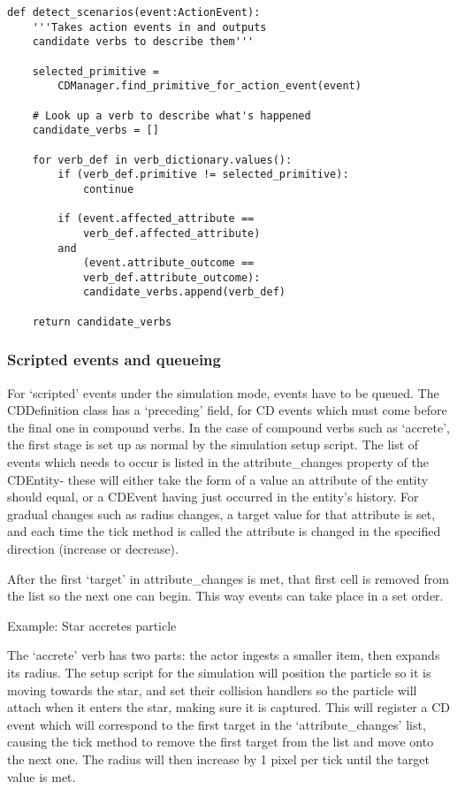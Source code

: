 \documentclass[dissertation.tex]{subfiles}
\begin{document}
\begin{lstlisting}[frame=single,caption={CDManager.detect\_scenarios method}]
def detect_scenarios(event:ActionEvent):
    '''Takes action events in and outputs
    candidate verbs to describe them'''
    
    selected_primitive =
        CDManager.find_primitive_for_action_event(event)            

    # Look up a verb to describe what's happened
    candidate_verbs = []

    for verb_def in verb_dictionary.values():
        if (verb_def.primitive != selected_primitive):
            continue

        if (event.affected_attribute ==
            verb_def.affected_attribute)
        and
            (event.attribute_outcome ==
            verb_def.attribute_outcome):
            candidate_verbs.append(verb_def)
    
    return candidate_verbs
\end{lstlisting}

    \subsubsection{Scripted events and queueing}
    For `scripted' events under the simulation mode, events have to be queued. The CDDefinition class has a `preceding' field, for CD events which must come before the final one in compound verbs. In the case of compound verbs such as `accrete', the first stage is set up as normal by the simulation setup script. The list of events which needs to occur is listed in the attribute\_changes property of the CDEntity- these will either take the form of a value an attribute of the entity should equal, or a CDEvent having just occurred in the entity's history. For gradual changes such as radius changes, a target value for that attribute is set, and each time the tick method is called the attribute is changed in the specified direction (increase or decrease).

    After the first `target' in attribute\_changes is met, that first cell is removed from the list so the next one can begin. This way events can take place in a set order.

    Example: Star accretes particle

    The `accrete' verb has two parts: the actor ingests a smaller item, then expands its radius. The setup script for the simulation will position the particle so it is moving towards the star, and set their collision handlers so the particle will attach when it enters the star, making sure it is captured. This will register a CD event which will correspond to the first target in the `attribute\_changes' list, causing the tick method to remove the first target from the list and move onto the next one. The radius will then increase by 1 pixel per tick until the target value is met.
\end{document}
